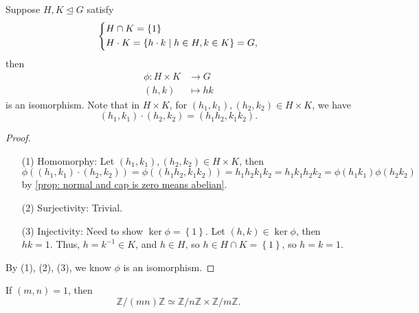 \begin{proposition}
    Suppose \(H, K \trianglelefteq G\) satisfy 
    \[
        \begin{dcases}
            H \cap K = \left\{ 1 \right\} \\
            H \cdot K = \left\{ h \cdot k \mid h \in H, k \in K \right\} = G, 
        \end{dcases}
    \] then 
    \begin{align*}
        \phi : H \times K &\to G \\
        (h, k) &\mapsto hk
    \end{align*}
    is an isomorphism. Note that in \(H \times K\), for \((h_1, k_1), (h_2, k_2) \in H \times K\), we have
    \[
        (h_1, k_1) \cdot (h_2, k_2) = (h_1 h_2, k_1 k_2).
    \]  
\end{proposition}
\begin{proof}
    \vphantom{text}
    \begin{itemize}
        \item [(1)] Homomorphy: Let \((h_1, k_1), (h_2, k_2) \in H \times K\), then 
        \[
            \phi \left( (h_1, k_1) \cdot (h_2, k_2) \right) = \phi ((h_1 h_2, k_1 k_2)) = h_1 h_2 k_1 k_2 = h_1 k_1 h_2 k_2 = \phi (h_1 k_1) \phi (h_2 k_2) 
        \] by \autoref{prop: normal and cap is zero means abelian}. 
        \item [(2)] Surjectivity: Trivial. 
        \item [(3)] Injectivity: Need to show \(\ker \phi = \left\{ 1 \right\} \). Let \((h , k)  \in \ker \phi \), then \(hk = 1\). Thus, \(h = k^{-1} \in K\), and \(h \in H\), so \(h \in H \cap K = \left\{ 1 \right\} \), so \(h = k = 1\).     
    \end{itemize}
    By (1), (2), (3), we know \(\phi \) is an isomorphism. 
\end{proof}

\begin{theorem}
    If \((m, n) = 1\), then 
    \[
        \mathbb{Z} / (mn) \mathbb{Z} \simeq \mathbb{Z} / n \mathbb{Z} \times \mathbb{Z} / m \mathbb{Z}.
    \] 
\end{theorem}